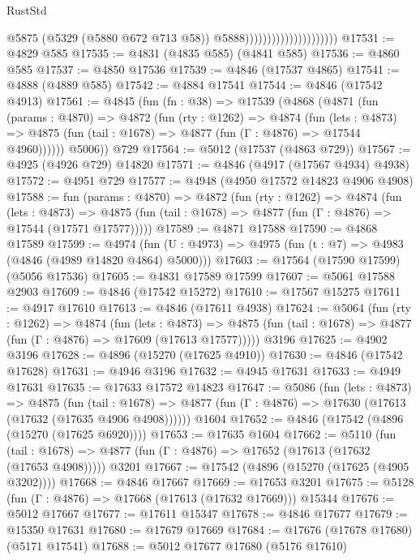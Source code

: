 \begin{lexlean}{RustStd}
\begin{coremodule}
                                              @5875
                                              (@5329 (@5880 @672 @713 @58))
                                              @5888)))))))))))))))))))))
@17531 := @4829 @585
@17535 := @4831 (@4835 @585) (@4841 @585)
@17536 := @4860 @585
@17537 := @4850 @17536
@17539 := @4846 (@17537 @4865)
@17541 := @4888 (@4889 @585)
@17542 := @4884 @17541
@17544 := @4846 (@17542 @4913)
@17561 := @4845
    (fun (fn : @38) =>
    @17539
      (@4868
        (@4871
          (fun (params : @4870) =>
          @4872
            (fun (rty : @1262) =>
            @4874
              (fun (lets : @4873) =>
              @4875 (fun (tail : @1678) => @4877 (fun (Γ : @4876) => @17544 @4960))))))
        @5006))
    @729
@17564 := @5012 (@17537 (@4863 @729))
@17567 := @4925 (@4926 @729) @14820
@17571 := @4846 (@4917 (@17567 @4934) @4938)
@17572 := @4951 @729
@17577 := @4948 (@4950 @17572 @14823 @4906 @4908)
@17588 := fun (params : @4870) =>
  @4872
    (fun (rty : @1262) =>
    @4874
      (fun (lets : @4873) =>
      @4875 (fun (tail : @1678) => @4877 (fun (Γ : @4876) => @17544 (@17571 @17577)))))
@17589 := @4871 @17588
@17590 := @4868 @17589
@17599 := @4974
    (fun (U : @4973) => @4975 (fun (t : @7) => @4983 (@4846 (@4989 @14820 @4864) @5000)))
@17603 := @17564 (@17590 @17599) (@5056 @17536)
@17605 := @4831 @17589 @17599
@17607 := @5061 @17588 @2903
@17609 := @4846 (@17542 @15272)
@17610 := @17567 @15275
@17611 := @4917 @17610
@17613 := @4846 (@17611 @4938)
@17624 := @5064
    (fun (rty : @1262) =>
    @4874
      (fun (lets : @4873) =>
      @4875 (fun (tail : @1678) => @4877 (fun (Γ : @4876) => @17609 (@17613 @17577)))))
    @3196
@17625 := @4902 @3196
@17628 := @4896 (@15270 (@17625 @4910))
@17630 := @4846 (@17542 @17628)
@17631 := @4946 @3196
@17632 := @4945 @17631
@17633 := @4949 @17631
@17635 := @17633 @17572 @14823
@17647 := @5086
    (fun (lets : @4873) =>
    @4875
      (fun (tail : @1678) =>
      @4877 (fun (Γ : @4876) => @17630 (@17613 (@17632 (@17635 @4906 @4908))))))
    @1604
@17652 := @4846 (@17542 (@4896 (@15270 (@17625 @6920))))
@17653 := @17635 @1604
@17662 := @5110
    (fun (tail : @1678) => @4877 (fun (Γ : @4876) => @17652 (@17613 (@17632 (@17653 @4908)))))
    @3201
@17667 := @17542 (@4896 (@15270 (@17625 (@4905 @3202))))
@17668 := @4846 @17667
@17669 := @17653 @3201
@17675 := @5128 (fun (Γ : @4876) => @17668 (@17613 (@17632 @17669))) @15344
@17676 := @5012 @17667
@17677 := @17611 @15347
@17678 := @4846 @17677
@17679 := @15350 @17631
@17680 := @17679 @17669
@17684 := @17676 (@17678 @17680) (@5171 @17541)
@17688 := @5012 @17677 @17680 (@5176 @17610)

\end{coremodule}
\end{lexlean}
